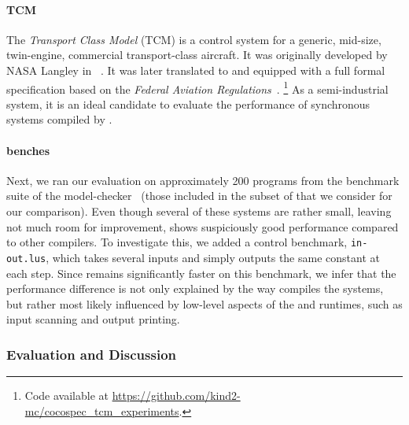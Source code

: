 \paragraph{TCM}
The \emph{Transport Class Model} (TCM) is a control system for a generic, mid-size, twin-engine,
commercial transport-class aircraft. It was originally developed by \textsc{NASA} Langley in
\Simulink~\cite{tcmOriginal}. It was later translated to \Lustre and equipped with a full formal
specification based on the \emph{Federal Aviation Regulations}~\cite{tcmCocospec}.%
\footnote{
    Code available at
    \href{https://github.com/kind2-mc/cocospec_tcm_experiments/tree/3b0834704e8434f1da08e45f79f129330faca6fc/systems}
    {https://github.com/kind2-mc/cocospec\_tcm\_experiments}.
}
As a semi-industrial system, it is an ideal candidate to evaluate the performance of synchronous
systems compiled by \GRust.

\paragraph{\Kind benches}
Next, we ran our evaluation on approximately 200 \Lustre programs from the benchmark suite of the
\Kind model-checker~\cite{DBLP:conf/cav/ChampionMST16} (those included in the subset of \Lustre
that we consider for our comparison). Even though several of these systems are rather small, leaving
not much room for improvement, \GLustre shows suspiciously good performance compared to other
\Lustre compilers. To investigate this, we added a control benchmark, \texttt{in-out.lus}, which
takes several inputs and simply outputs the same constant at each step. Since \GLustre remains
significantly faster on this benchmark, we infer that the performance difference is not only
explained by the way \GLustre compiles the systems, but rather most likely influenced by low-level
aspects of the \Ci and \Rust runtimes, such as input scanning and output printing.

\subsubsection{Evaluation and Discussion}

